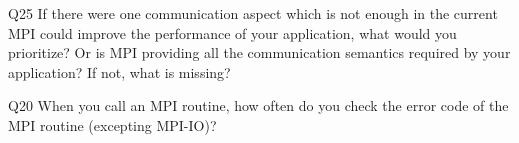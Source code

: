 \begin{description}%
\item{Q25} If there were one communication aspect which is not enough in the current MPI could improve the performance of your application, what would you prioritize? Or is MPI providing all the communication semantics required by your application? If not, what is missing?%
\item{Q20} When you call an MPI routine, how often do you check the error code of the MPI routine  (excepting MPI-IO)?%
\end{description}%
